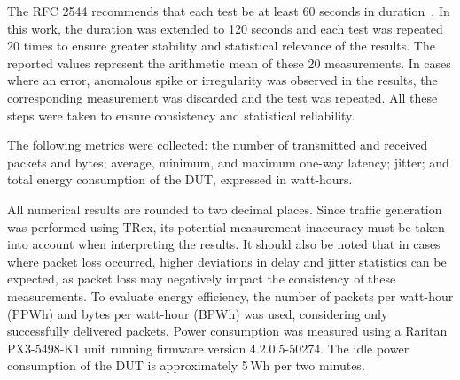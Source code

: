 The RFC 2544 recommends that each test be at least 60 seconds in duration~\cite{rfc2544}. 
In this work, the duration was extended to 120 seconds and each test was repeated 20 times to ensure greater stability and statistical relevance of the results. 
The reported values represent the arithmetic mean of these 20 measurements.
In cases where an error, anomalous spike or irregularity was observed in the results, the corresponding measurement was discarded and the test was repeated. 
All these steps were taken to ensure consistency and statistical reliability.

The following metrics were collected: the number of transmitted and received packets and bytes; average, minimum, and maximum one-way latency; jitter; 
and total energy consumption of the DUT, expressed in watt-hours.

All numerical results are rounded to two decimal places.
Since traffic generation was performed using TRex, its potential measurement inaccuracy must be taken into account when interpreting the results.
It should also be noted that in cases where packet loss occurred, higher deviations in delay and jitter statistics can be expected, as packet loss may negatively impact the consistency of these measurements.
To evaluate energy efficiency, the number of packets per watt-hour (PPWh) and bytes per watt-hour (BPWh) was used, considering only successfully delivered packets.
Power consumption was measured using a Raritan PX3-5498-K1 unit running firmware version 4.2.0.5-50274.
The idle power consumption of the DUT is approximately 5 Wh per two minutes.
